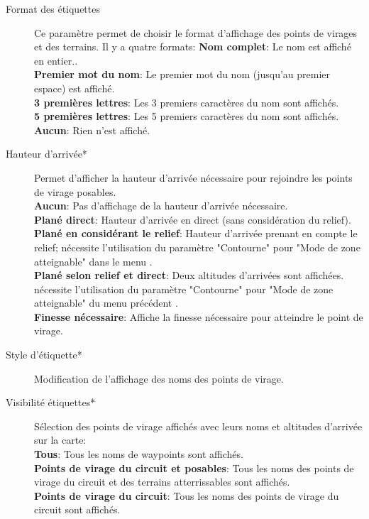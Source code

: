 \begin{description}
\item[Format des étiquettes]  Ce paramètre \label{conf:labels} permet de choisir le format d'affichage des points de virages et des terrains. Il y a quatre formats: 
  {\bf Nom complet}: Le nom est affiché en entier.. \\
  {\bf Premier mot du nom}: Le premier mot du nom (jusqu'au premier espace) est affiché. \\
  {\bf 3 premières lettres}: Les 3 premiers caractères du nom sont affichés.\\
  {\bf 5 premières lettres}: Les 5 premiers caractères du nom sont affichés. \\
  {\bf Aucun}: Rien n'est affiché.
\item[Hauteur d'arrivée*]  Permet d'afficher la hauteur d'arrivée nécessaire pour rejoindre les points de virage posables.\\
  {\bf Aucun}: Pas d'affichage de la hauteur d'arrivée nécessaire. \\
  {\bf Plané direct}: Hauteur d'arrivée en direct (sans considération du relief).\\
  {\bf Plané en considérant le relief}: Hauteur d'arrivée prenant en compte le relief; nécessite l'utilisation du paramètre "Contourne" pour "Mode de zone atteignable" dans le menu \blink{}\blink{}\blink{}.\\
  {\bf Plané selon relief et direct}: Deux altitudes d'arrivées sont affichées. nécessite l'utilisation du paramètre "Contourne" pour "Mode de zone atteignable" du menu précédent .\\
  {\bf Finesse nécessaire}: Affiche la finesse nécessaire pour atteindre le point de virage.
\item[Style d'étiquette*]  Modification de l'affichage des noms des points de virage.
\item[Visibilité étiquettes*]  \label{conf:labelvisibility} Sélection des points de virage affichés avec leurs noms et altitudes d'arrivée sur la carte:\\
  {\bf Tous}: Tous les noms de waypoints sont affichés.\\
  {\bf Points de virage du circuit et posables}: Tous les noms des points de virage du circuit et des terrains atterrissables sont affichés.\\
  {\bf Points de virage du circuit}: Tous les noms des points de virage du circuit sont affichés. \\

\end{description}
